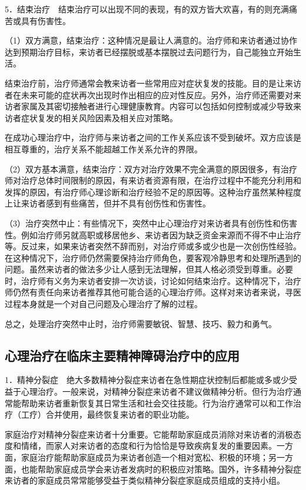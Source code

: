 5．结束治疗　结束治疗可以出现不同的表现，有的双方皆大欢喜，有的则充满痛苦或具有伤害性。

（1）双方满意，结束治疗：这种情况是最让人满意的。治疗师和来访者通过协作达到预期治疗目标，来访者已经摆脱或基本摆脱过去问题行为，自己能独立开始生活。

结束治疗前，治疗师通常会教来访者一些常用应对症状复发的技能。目的是让来访者在未来可能的症状再次出现时作出相应的应对性反应。另外，治疗师还需要对来访者家属及其密切接触者进行心理健康教育。内容可以包括如何控制或减少导致来访者症状复发的相关风险因素及相关应对策略。

在成功心理治疗中，治疗师与来访者之间的工作关系应该不受到破坏。双方应该是相互尊重的，治疗关系不能超越工作关系允许的界限。

（2）双方基本满意，结束治疗：双方对治疗效果不完全满意的原因很多，有治疗师对治疗总体时间限制的原因，有来访者资源有限，在治疗过程中不能充分利用和发挥的原因，有治疗师心理诊断和治疗经验不足的原因等。这种治疗虽然某种程度上让来访者感到有些痛苦，但并不具有创伤性和伤害性。

（3）治疗突然中止：有些情况下，突然中止心理治疗对来访者具有创伤性和伤害性。例如治疗师另就高职或移居他乡、来访者因为缺乏资金来源而不得不中止治疗等。反过来，如果来访者突然不辞而别，对治疗师或多或少也是一次创伤性经验。在这种情况下，治疗师仍然需要保持治疗师角色，要客观冷静思考和处理所遇到的问题。虽然来访者的做法多少让人感到无法理解，但其人格必须受到尊重。必要时，治疗师有义务为来访者安排一次访谈，讨论如何结束治疗。这种情况下，治疗师仍然有责任向来访者推荐其他可能合适的心理治疗师。这样对来访者来说，寻医过程本身就是一个对自己问题及心理治疗了解的过程。

总之，处理治疗突然中止时，治疗师需要敏锐、智慧、技巧、毅力和勇气。

\subsection{心理治疗在临床主要精神障碍治疗中的应用}

1．精神分裂症　绝大多数精神分裂症来访者在急性期症状控制后都能或多或少受益于心理治疗。一般来说，对精神分裂症来访者不建议做精神分析。但行为治疗通常能帮助来访者重新恢复其日常生活和社会交往技能。行为治疗通常可以和工作治疗（工疗）合并使用，最终恢复来访者的职业功能。

家庭治疗对精神分裂症来访者十分重要。它能帮助家庭成员消除对来访者的消极态度和情绪，而家人对来访者的态度和行为恰恰是导致疾病复发的重要因素。一方面，家庭治疗能帮助家庭成员为来访者创造一个相对宽松、积极的环境；另一方面，也能帮助家庭成员学会来访者发病时的积极应对策略。国外，许多精神分裂症来访者的家庭成员常常能够受益于类似精神分裂症家庭成员组成的支持小组。

